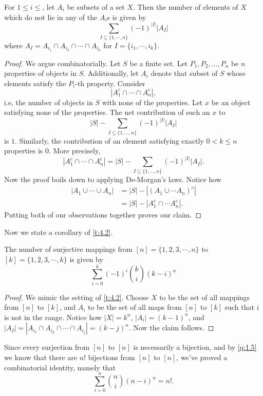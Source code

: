 \begin{theorem}
For $1\leq i\leq$, let $A_i$ be subsets of a set $X$. Then the number of elements of $X$ which do not lie in any of the $A_i$s is given by
\[
\sum_{I\subseteq \{1,\cdots,n\}}(-1)^{|I|}|A_I|
\] where $A_I = A_{i_1}\cap A_{i_2}\cap \cdots \cap A_{i_k}$ for $I=\{i_1,\cdots,i_k\}$. 
\label{t:4.2}
\end{theorem}
\begin{proof}
We argue combinatorially. Let $S$ be a finite set. Let $P_1,P_2,\ldots,P_n$ be $n$ properties of objects in $S$. Additionally, let $A_i$ denote that subset of $S$ whose elements satisfy the $P_i$-th property. Consider \[
|A_1^c \cap \cdots \cap A_n^c|,
\] i.e, the number of objects in $S$ with none of the properties. Let $x$ be an object satisfying none of the properties. The net contribution of such an $x$ to 
\[
|S| - \sum_{I\subseteq \{1,\ldots,n\}} (-1)^{|I|}|A_I|
\] is $1$. Similarly, the contribution of an element satisfying exactly $0<k\leq n$ properties is $0$. More precisely,
\[
|A_1^c\cap \cdots \cap A_n^c| = |S| - \sum_{I\subseteq \{1,\ldots,n\}}(-1)^{|I|}|A_I|.
\]
Now the proof boils down to applying De-Morgan's laws. Notice how 
\begin{align*}
|A_1\cup \cdots \cup A_n| &= |S|-|(A_1\cup \cdots A_n)^c| \\
&= |S| - |A_1^c\cap \cdots A_n^c|.
\end{align*}
Putting both of our observations together proves our claim. 
\end{proof}
Now we state a corollary of \cref{t:4.2}.
\begin{claim}
The number of surjective mappings from $[n]=\{1,2,3,\cdots,n\}$ to $[k]=\{1,2,3,\cdots,k\}$ is given by \[
    \sum_{i=0}^{k}(-1)^i\binom{k}{i}(k-i)^n
\]
\label{c:SurjMap}
\end{claim}
\begin{proof}
We mimic the setting of \cref{t:4.2}. Choose $X$ to be the set of all mappings from $[n]$ to $[k]$, and $A_i$ to be the set of all maps from $[n]$ to $[k]$ such that $i$ is not in the range. Notice how $|X|=k^n$, $|A_i|=(k-1)^n$, and $|A_I| = |A_{i_1}\cap A_{i_2}\cap \cdots \cap A_{i_j}|=(k-j)^n$. Now the claim follows. 
\end{proof}

\begin{remark}
Since every surjection from $[n]$ to $[n]$ is necessarily a bijection, and by \cref{q:1.5} we know that there are $n!$ bijections from $[n]$ to $[n]$, we've proved a combinatorial identity, namely that
\[
\sum_{i=0}^{n}\binom{n}{i}(n-i)^n=n!.
\]
\end{remark}
